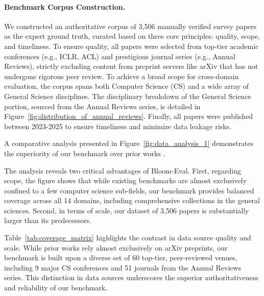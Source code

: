\documentclass[11pt]{article}
\begin{document}
\paragraph{Benchmark Corpus Construction.}
We constructed an authoritative corpus of 3,506 manually verified survey papers as the expert ground truth, curated based on three core principles: quality, scope, and timeliness. To ensure quality, all papers were selected from top-tier academic conferences (e.g., ICLR, ACL) and prestigious journal series (e.g., Annual Reviews), strictly excluding content from preprint servers like arXiv that has not undergone rigorous peer review. To achieve a broad scope for cross-domain evaluation, the corpus spans both Computer Science (CS) and a wide array of General Science disciplines. The disciplinary breakdown of the General Science portion, sourced from the Annual Reviews series, is detailed in Figure~\ref{fig:distribution_of_annual_reviews}. Finally, all papers were published between 2023-2025 to ensure timeliness and minimize data leakage risks. 

A comparative analysis presented in Figure~\ref{fig:data_analysis_1} demonstrates the superiority of our benchmark over prior works \citep{wang2024autosurvey, yan2025surveyforge, liang2025surveyx, wang2025llmmapreducev2}. 

The analysis reveals two critical advantages of Bloom-Eval. First, regarding scope, the figure shows that while existing benchmarks are almost exclusively confined to a few computer science sub-fields, our benchmark provides balanced coverage across all 14 domains, including comprehensive collections in the general sciences. Second, in terms of scale, our dataset of 3,506 papers is substantially larger than its predecessors.

Table~\ref{tab:coverage_matrix} highlights the contrast in data source quality and scale. While prior works \citep{guo2025sgsimeval} rely almost exclusively on arXiv preprints, our benchmark is built upon a diverse set of 60 top-tier, peer-reviewed venues, including 9 major CS conferences and 51 journals from the Annual Reviews series. This distinction in data sources underscores the superior authoritativeness and reliability of our benchmark.

\end{document}
